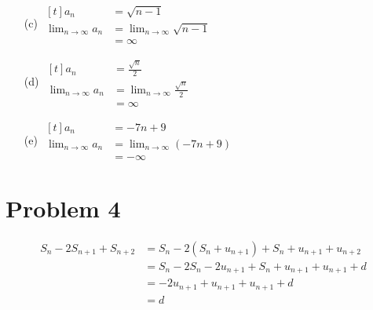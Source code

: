 \documentclass{article}
\begin{document}
\begin{multicols}{2}
\begin{itemize}
\item[(c)]
	$\begin{aligned}[t]
		a_n&=\sqrt{n-1} \\
		\lim_{n\to\infty}a_n&=\lim_{n\to\infty}\sqrt{n-1} \\
		&=\boxed{\infty}
	\end{aligned}$

\item[(d)]
	$\begin{aligned}[t]
		a_n&=\frac{\sqrt{n}}{2} \\
		\lim_{n\to\infty}a_n&=\lim_{n\to\infty}\frac{\sqrt{n}}{2} \\
		&=\boxed{\infty}
	\end{aligned}$

\item[(e)]
	$\begin{aligned}[t]
		a_n&=-7n+9 \\
		\lim_{n\to\infty}a_n&=\lim_{n\to\infty}(-7n+9) \\
		&=\boxed{-\infty}
	\end{aligned}$

\end{itemize}
\end{multicols}

\section*{Problem 4}
\begin{align*}
	S_n-2S_{n+1}+S_{n+2}&=S_n-2(S_n+u_{n+1})+S_n+u_{n+1}+u_{n+2} \\
	&=S_n-2S_n-2u_{n+1}+S_n+u_{n+1}+u_{n+1}+d \\
	&=-2u_{n+1}+u_{n+1}+u_{n+1}+d \\
	&=\boxed{d}
\end{align*}
\end{document}
